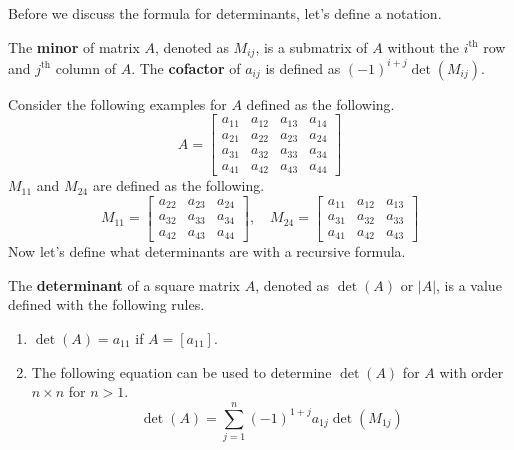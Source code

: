 \documentclass[../main.tex]{subfiles}
\begin{document}
Before we discuss the formula for determinants, let's define a
notation.

\begin{definition}
The \textbf{minor} of matrix $A$, denoted as $M_{ij}$, is a submatrix
of $A$ without the $i^\text{th}$ row and $j^\text{th}$ column of $A$.
The \textbf{cofactor} of $a_{ij}$ is defined as $(-1)^{i+j}
\det(M_{ij})$.
\end{definition}

Consider the following examples for $A$ defined as the following.
\[
A =
\begin{bmatrix}
    a_{11} & a_{12} & a_{13} & a_{14} \\
    a_{21} & a_{22} & a_{23} & a_{24} \\
    a_{31} & a_{32} & a_{33} & a_{34} \\
    a_{41} & a_{42} & a_{43} & a_{44}
\end{bmatrix}
\]
$M_{11}$ and $M_{24}$ are defined as the following.
\[
M_{11} =
\begin{bmatrix}
    a_{22} & a_{23} & a_{24} \\
    a_{32} & a_{33} & a_{34} \\
    a_{42} & a_{43} & a_{44}
\end{bmatrix}, \quad
M_{24} =
\begin{bmatrix}
    a_{11} & a_{12} & a_{13} \\
    a_{31} & a_{32} & a_{33} \\
    a_{41} & a_{42} & a_{43}
\end{bmatrix}
\]
Now let's define what determinants are with a recursive formula.

\begin{definition}
The \textbf{determinant} of a square matrix $A$, denoted as $\det(A)$
or $|A|$, is a value defined with the following rules.
\begin{enumerate}[noitemsep]
\item $\det(A) = a_{11}$ if $A = [a_{11}]$.
\item The following equation can be used to determine $\det(A)$ for
$A$ with order $n \times n$ for $n > 1$.
\vspace{-0.5\baselineskip}
\[
\det(A)
= \sum_{j=1}^n (-1)^{1 + j} a_{1j} \det(M_{1j})
\]
\end{enumerate}
\end{definition}
\end{document}
